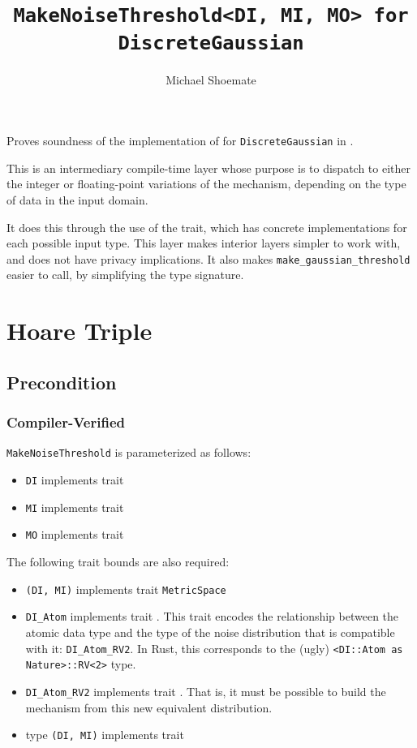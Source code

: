 \documentclass{article}
\title{\texttt{MakeNoiseThreshold<DI, MI, MO> for DiscreteGaussian}}
\author{Michael Shoemate}
\date{}
\begin{document}
\maketitle

\contrib
Proves soundness of the implementation of  
for \texttt{DiscreteGaussian} in .

This is an intermediary compile-time layer whose purpose is 
to dispatch to either the integer or floating-point variations of the mechanism,
depending on the type of data in the input domain.

It does this through the use of the  trait,
which has concrete implementations for each possible input type.
This layer makes interior layers simpler to work with, and does not have privacy implications.
It also makes \texttt{make\_gaussian\_threshold} easier to call,
by simplifying the type signature.

\section{Hoare Triple}
\subsection*{Precondition}
\subsubsection*{Compiler-Verified}
\texttt{MakeNoiseThreshold} is parameterized as follows:
\begin{itemize}
    \item \texttt{DI} implements trait 
    \item \texttt{MI} implements trait 
    \item \texttt{MO} implements trait 
\end{itemize}

The following trait bounds are also required:
\begin{itemize}
    \item \texttt{(DI, MI)} implements trait \texttt{MetricSpace}
    \item \texttt{DI\_Atom} implements trait .
        This trait encodes the relationship between the atomic data type 
        and the type of the noise distribution that is compatible with it: \texttt{DI\_Atom\_RV2}.
        In Rust, this corresponds to the (ugly) \texttt{<DI::Atom as Nature>::RV<2>} type.
    \item \texttt{DI\_Atom\_RV2} implements trait .
        That is, it must be possible to build the mechanism from this new equivalent distribution.
    \item type \texttt{(DI, MI)} implements trait 
\end{itemize}
\end{document}
